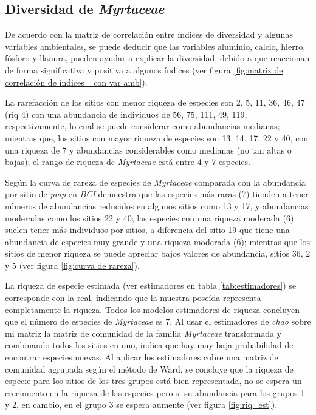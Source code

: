 \documentclass[11pt,]{article}
\begin{document}
\subsection{\texorpdfstring{Diversidad de
\emph{Myrtaceae}}{Diversidad de Myrtaceae}}\label{diversidad-de-myrtaceae}

De acuerdo con la matriz de correlación entre índices de diversidad y
algunas variables ambientales, se puede deducir que las variables
aluminio, calcio, hierro, fósforo y llanura, pueden ayudar a explicar la
diversidad, debido a que reaccionan de forma significativa y positiva a
algunos índices (ver figura
\ref{fig:matriz de correlación de índices _con var amb}).

La rarefacción de los sitios con menor riqueza de especies son 2, 5, 11,
36, 46, 47 (riq 4) con una abundancia de individuos de 56, 75, 111, 49,
119, respectivamente, lo cual se puede considerar como abundancias
medianas; mientras que, los sitios con mayor riqueza de especies son 13,
14, 17, 22 y 40, con una riqueza de 7 y abundancias considerables como
medianas (no tan altas o bajas); el rango de riqueza de \emph{Myrtaceae}
está entre 4 y 7 especies.

Según la curva de rareza de especies de \emph{Myrtaceae} comparada con
la abundancia por sitio de \emph{pmp} en \emph{BCI} demuestra que las
especies más raras (7) tienden a tener números de abundancias reducidos
en algunos sitios como 13 y 17, y abundancias moderadas como los sitios
22 y 40; las especies con una riqueza moderada (6) suelen tener más
individuos por sitios, a diferencia del sitio 19 que tiene una
abundancia de especies muy grande y una riqueza moderada (6); mientras
que los sitios de menor riqueza se puede apreciar bajos valores de
abundancia, sitios 36, 2 y 5 (ver figura \ref{fig:curva de rareza}).

La riqueza de especie estimada (ver estimadores en tabla
\ref{tab:estimadores}) se corresponde con la real, indicando que la
muestra poseída representa completamente la riqueza. Todos los modelos
estimadores de riqueza concluyen que el número de especies de
\emph{Myrtaceae} es 7. Al usar el estimadores de \emph{chao} sobre mi
matriz la matriz de comunidad de la familia \emph{Myrtaceae}
transformada y combinando todos los sitios en uno, indica que hay muy
baja probabilidad de encontrar especies nuevas. Al aplicar los
estimadores cobre una matriz de comunidad agrupada según el método de
Ward, se concluye que la riqueza de especie para los sitios de los tres
grupos está bien representada, no se espera un crecimiento en la riqueza
de las especies pero si su abundancia para los grupos 1 y 2, en cambio,
en el grupo 3 se espera aumente (ver figura \ref{fig:riq_est}).
\end{document}
